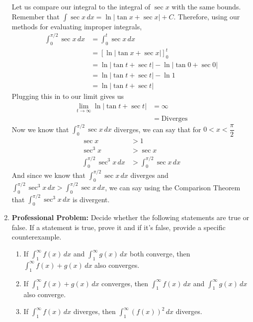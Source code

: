 \documentclass{article}
\begin{document}
\begin{enumerate}[label=\textbf{(6.\arabic*)}]
Let us compare our integral to the integral of $\sec x$ with the same bounds. Remember that $\displaystyle\int\!\sec x\,dx = \ln|\tan x+\sec x|+C$. Therefore, using our methods for evaluating improper integrals,
\begin{align*}
    \int_0^{\pi/2}\!\sec x\,dx &= \int_0^t\!\sec x\,dx \\
    &= \left[\ln|\tan x+\sec x|\right]_0^t \\
    &= \ln|\tan t+\sec t|-\ln|\tan 0 +\sec 0| \\
    &= \ln|\tan t+\sec t|-\ln1 \\
    &= \ln|\tan t+\sec t|
\end{align*}
Plugging this in to our limit gives us
\begin{align*}
    \lim_{t\to\infty} \ln|\tan t+\sec t| &= \infty \\
    &=\mathrm{Diverges}
\end{align*}
Now we know that $\displaystyle \int_0^{\pi/2}\!\sec x\,dx$ diverges, we can say that for $0<x<\dfrac{\pi}{2}$
\begin{align*}
    \sec x &> 1 \\
    \sec^3x &> \sec x \\
    \displaystyle \int_0^{\pi/2}\!\sec^3x\,dx &> \int_0^{\pi/2}\!\sec x\,dx
\end{align*}
And since we know that $\displaystyle \int_0^{\pi/2}\!\sec x\,dx$ diverges and $\displaystyle \int_0^{\pi/2}\!\sec^3x\,dx>\int_0^{\pi/2}\!\sec x\,dx$, 
we can say using the Comparison Theorem that $\displaystyle \int_0^{\pi/2}\!\sec^3x\,dx$ is divergent.


\newpage


\item \textbf{Professional Problem:} Decide whether the following statements are true or false. If a statement is true, prove it and if it's false, provide a specific counterexample.
\begin{enumerate}
    \item If $\int_1^\infty\!f(x)\,dx$ and $\int_1^\infty\!g(x)\,dx$ both converge, then $\int_1^\infty\!f(x)+g(x)\,dx$ also converges.
    \item If $\int_1^\infty\!f(x)+g(x)\,dx$ converges, then $\int_1^\infty\!f(x)\,dx$ and $\int_1^\infty\!g(x)\,dx$ also converge.
    \item If $\int_1^\infty\!f(x)\,dx$ diverges, then $\int_1^\infty\!\left(f(x)\right)^2\,dx$ diverges.
\end{enumerate}


\end{enumerate}
\end{document}
